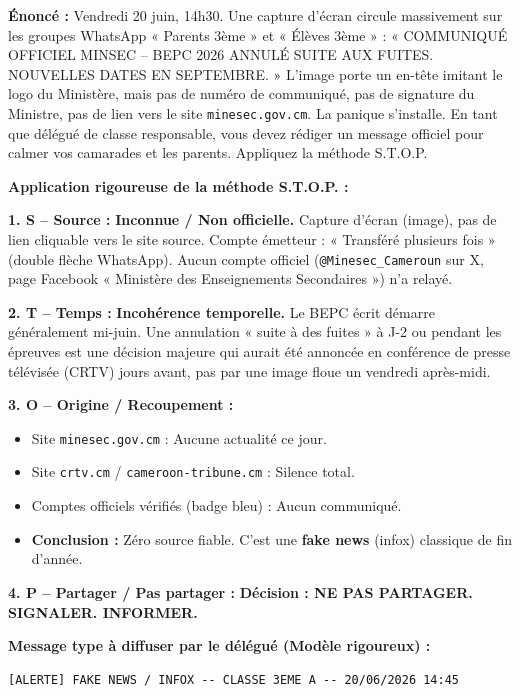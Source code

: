 \documentclass[11pt]{article}
\begin{document}
\begin{exoresolu}
\textbf{Énoncé :} Vendredi 20 juin, 14h30. Une capture d'écran circule massivement sur les groupes WhatsApp « Parents 3ème » et « Élèves 3ème » : « COMMUNIQUÉ OFFICIEL MINSEC -- BEPC 2026 ANNULÉ SUITE AUX FUITES. NOUVELLES DATES EN SEPTEMBRE. » L'image porte un en-tête imitant le logo du Ministère, mais pas de numéro de communiqué, pas de signature du Ministre, pas de lien vers le site \texttt{minesec.gov.cm}. La panique s'installe. En tant que délégué de classe responsable, vous devez rédiger un message officiel pour calmer vos camarades et les parents. Appliquez la méthode S.T.O.P.

\tcblower
\textbf{Application rigoureuse de la méthode S.T.O.P. :}

\textbf{1. S -- Source :} \textbf{Inconnue / Non officielle.} Capture d'écran (image), pas de lien cliquable vers le site source. Compte émetteur : « Transféré plusieurs fois » (double flèche WhatsApp). Aucun compte officiel (\texttt{@Minesec\_Cameroun} sur X, page Facebook « Ministère des Enseignements Secondaires ») n'a relayé.

\textbf{2. T -- Temps :} \textbf{Incohérence temporelle.} Le BEPC écrit démarre généralement mi-juin. Une annulation « suite à des fuites » à J-2 ou pendant les épreuves est une décision majeure qui aurait été annoncée en conférence de presse télévisée (CRTV) jours avant, pas par une image floue un vendredi après-midi.

\textbf{3. O -- Origine / Recoupement :}
\begin{itemize}
    \item Site \texttt{minesec.gov.cm} : Aucune actualité ce jour.
    \item Site \texttt{crtv.cm} / \texttt{cameroon-tribune.cm} : Silence total.
    \item Comptes officiels vérifiés (badge bleu) : Aucun communiqué.
    \item \textbf{Conclusion :} Zéro source fiable. C'est une \textbf{fake news} (infox) classique de fin d'année.
\end{itemize}

\textbf{4. P -- Partager / Pas partager :} \textbf{Décision : NE PAS PARTAGER. SIGNALER. INFORMER.}

\textbf{Message type à diffuser par le délégué (Modèle rigoureux) :}

\begin{lstlisting}[language=text]
[ALERTE] FAKE NEWS / INFOX -- CLASSE 3EME A -- 20/06/2026 14:45


\end{lstlisting}
\end{exoresolu}
\end{document}
